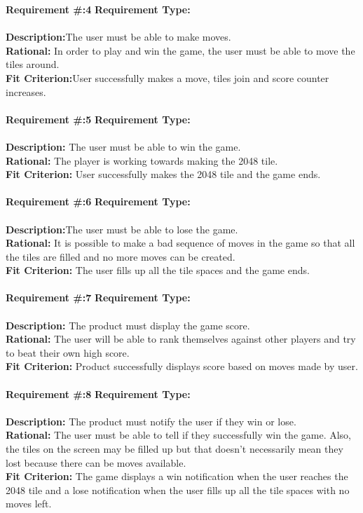 \documentclass[12pt]{article}
\begin{document}
\textbf {Requirement \#:4} \indent\textbf {Requirement Type:}\\\\
\textbf {Description:}The user must be able to make moves. \\
\textbf {Rational:} In order to play and win the game, the user must be able to move the tiles around. \\
\textbf {Fit Criterion:}User successfully makes a move, tiles join and score counter increases. \\\\

\textbf {Requirement \#:5} \indent\textbf {Requirement Type:} \\\\
\textbf {Description:} The user must be able to win the game.\\
\textbf {Rational:} The player is working towards making the 2048 tile. \\
\textbf {Fit Criterion:} User successfully makes the 2048 tile and the game ends. \\\\

\textbf {Requirement \#:6} \indent\textbf {Requirement Type:}\\\\
\textbf {Description:}The user must be able to lose the game. \\
\textbf {Rational:} It is possible to make a bad sequence of moves in the game so that all the tiles are filled and 
no more moves can be created.\\
\textbf {Fit Criterion:} The user fills up all the tile spaces and the game ends.\\\\

\textbf {Requirement \#:7} \indent\textbf {Requirement Type:} \\\\
\textbf {Description:} The product must display the game score.\\
\textbf {Rational:} The user will be able to rank themselves against other players and try to beat their own high 
score.\\
\textbf {Fit Criterion:} Product successfully displays score based on moves made by user.\\\\
\newpage
\textbf {Requirement \#:8} \indent\textbf {Requirement Type:} \\\\
\textbf {Description:} The product must notify the user if they win or lose.\\
\textbf {Rational:} The user must be able to tell if they successfully win the game. Also, the tiles on the screen 
may be filled up but that doesn't necessarily mean they lost because there can be moves available. \\
\textbf {Fit Criterion:} The game displays a win notification when the user reaches the 2048 tile and a lose 
notification when the user fills up all the tile spaces with no moves left. \\\\
\end{document}
